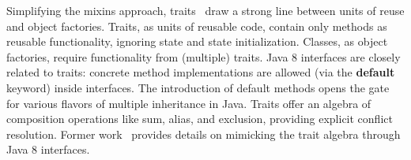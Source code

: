 Simplifying the mixins approach, traits~\cite{scharli03traits} draw a strong
line between units of reuse and object factories. Traits, as units of reusable
code, contain only methods as reusable functionality, ignoring state and state
initialization. Classes, as object factories, require functionality from
(multiple) traits. Java 8 interfaces are closely related to
traits: concrete method implementations are allowed (via the \textbf{default}
keyword) inside interfaces. The introduction of default methods opens the gate
for various flavors of multiple inheritance in Java. Traits offer an algebra
of composition operations like sum, alias, and exclusion, providing explicit conflict
resolution. Former work~\cite{bono14} provides details on mimicking the trait
algebra through Java 8 interfaces.
\begin{comment}
We briefly recall the main points of their
encoding; however we propose a different representation of \textbf{exclusion}.
The first author of~\cite{bono14} agreed (via personal communication) that
our revised version for exclusion is cleaner, typesafe and more direct.
\newcommand\shortItem{\vspace{-1ex}}
\begin{itemize}
\item \textbf{Symmetric sum} can be obtained by simple multiple inheritance between interfaces.
    \begin{lstlisting}
    interface A { int x(); }
    interface B { int y(); }
    interface C extends A, B {}
    \end{lstlisting}
\shortItem
\item \textbf{Overriding} a conflict is obtained by specifying which super interface take precedence.
    \begin{lstlisting}
    interface A { default int m() {return 1;} }
    interface B { default int m() {return 2;} }
    interface C extends A, B {
        default int m() {return B.super.m();} }
    \end{lstlisting}
\shortItem
\item \textbf{Alias} is creating  a new method delegating to the existing super interface.
    \begin{lstlisting}
    interface A { default int m() {return 1;} }
    interface B extends A {
        default int k() {return A.super.m();} }
    \end{lstlisting}
\shortItem

\item \textbf{Exclusion}: exclusion is also supported in Java, where method declarations can hide the default methods correspondingly in the super interfaces.
    \begin{lstlisting}
    interface A { default int m() {return 1;} }
    interface B extends A { int m(); }
    \end{lstlisting}
\shortItem
\end{itemize}
\end{comment}
